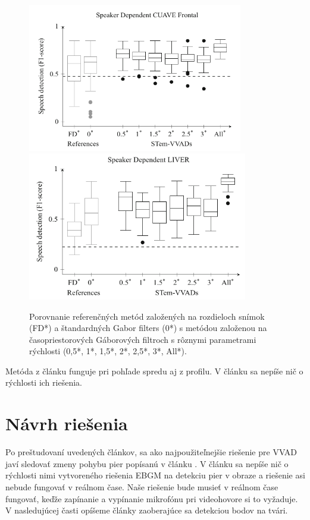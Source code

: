 \begin{figure}[H]
	\begin{center}
		\includegraphics[height=6.5cm]{pics/cuaveFrontal.png}
		\includegraphics[height=6.5cm]{pics/liver.png}
		\caption{Porovnanie referenčných metód založených na rozdieloch snímok (FD*) a štandardných Gabor filters (0*) s metódou založenou na časopriestorových Gáborových filtroch s rôznymi parametrami rýchlosti (0,5*, 1*, 1,5*, 2*, 2,5*, 3*, All*).
		 \cite{joosten2015voice}}
		\label{pic-joosten2015voice}
	\end{center}
\end{figure}

Metóda z článku \cite{joosten2015voice} funguje pri pohľade spredu aj z profilu.
V článku sa nepíše nič o rýchlosti ich riešenia.\\

\chapter{Návrh riešenia}
Po preštudovaní uvedených článkov, sa ako najpoužiteľnejšie riešenie pre VVAD javí sledovať zmeny pohybu pier popísanú v článku \cite{aoki2007voice}. 
V článku sa nepíše nič o rýchlosti nimi vytvoreného riešenia EBGM na detekciu pier v obraze a riešenie asi nebude fungovať v reálnom čase. 
Naše riešenie bude musieť v reálnom čase fungovať, keďže zapínanie a vypínanie mikrofónu pri videohovore si to vyžaduje. 
V nasledujúcej časti opíšeme články zaoberajúce sa detekciou bodov na tvári.\\


